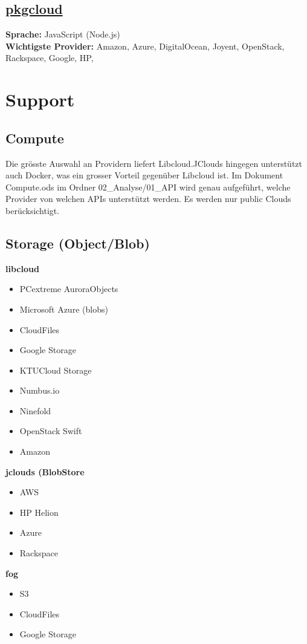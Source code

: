 \documentclass[11pt]{scrartcl}
\begin{document}
\subsection{\href{https://github.com/pkgcloud/pkgcloud}{pkgcloud}}
\textbf{Sprache: }JavaScript (Node.js)\\
\textbf{Wichtigste Provider: }Amazon, Azure, DigitalOcean, Joyent, OpenStack, Rackspace, Google, HP,\\

\newpage

\section{Support}
\subsection{Compute}
Die grösste Auswahl an Providern liefert Libcloud.JClouds hingegen unterstützt auch Docker, was ein grosser Vorteil gegenüber Libcloud ist. Im Dokument Compute.ods im Ordner 02\_Analyse\//01\_API wird genau aufgeführt, welche Provider von welchen APIs unterstützt werden. Es werden nur public Clouds berücksichtigt.

\subsection{Storage (Object/Blob)}
\textbf{libcloud}
\begin{itemize}
\item PCextreme AuroraObjects
\item Microsoft Azure (blobs)
\item CloudFiles
\item Google Storage
\item KTUCloud Storage
\item Numbus.io
\item Ninefold
\item OpenStack Swift
\item Amazon
\end{itemize}

\textbf{jclouds (BlobStore}
\begin{itemize}
\item AWS
\item HP Helion
\item Azure
\item Rackspace
\end{itemize}

\textbf{fog}
\begin{itemize}
\item S3
\item CloudFiles
\item Google Storage
\end{itemize}
\end{document}
